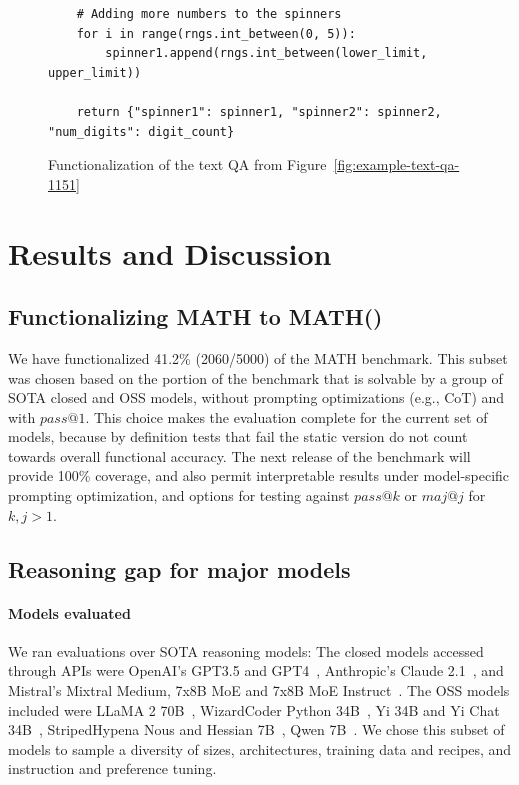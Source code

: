 \documentclass[11pt,a4paper]{article}
\begin{document}
\begin{figure}
\begin{verbatim}
    # Adding more numbers to the spinners
    for i in range(rngs.int_between(0, 5)):
        spinner1.append(rngs.int_between(lower_limit, upper_limit))

    return {"spinner1": spinner1, "spinner2": spinner2, "num_digits": digit_count}
\end{verbatim}
\caption{\label{fig:example-fn-qa-1151} Functionalization of the text QA from Figure~\ref{fig:example-text-qa-1151}}
\end{figure}

\section{Results and Discussion}

\subsection{Functionalizing MATH to MATH()}
We have functionalized 41.2\% (2060/5000) of the MATH benchmark. This subset was chosen based on the
portion of the benchmark that is solvable by a group of SOTA closed and OSS
models, without prompting optimizations (e.g., CoT) and with $pass@1$. This
choice makes the evaluation complete for the current set of models, because by
definition tests that fail the static version do not count towards overall
functional accuracy. The next release of the benchmark will provide 100\%
coverage, and also permit interpretable results under model-specific prompting
optimization, and options for testing against $pass@k$ or $maj@j$ for $k,j>1$.

\subsection{Reasoning gap for major models}
\paragraph{Models evaluated} We ran evaluations over SOTA reasoning models: The closed models accessed through APIs were OpenAI's GPT3.5 and GPT4~\cite{gpt4}, Anthropic's Claude 2.1~\cite{claude2.1}, and Mistral's Mixtral Medium, 7x8B MoE and 7x8B MoE Instruct~\cite{mixtral}. The OSS models included were LLaMA 2 70B~\cite{llama-2}, WizardCoder Python 34B~\cite{wizardcoder-34B}, Yi 34B and Yi Chat 34B~\cite{yi}, StripedHypena Nous and Hessian 7B~\cite{striped-hyena}, Qwen 7B~\cite{qwen}. We chose this subset of models to sample a diversity of sizes, architectures, training data and recipes, and instruction and preference tuning.
\end{document}
